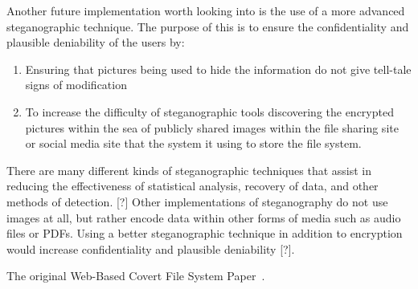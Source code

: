 \documentclass[12pt,journal,compsoc]{IEEEtran}
\begin{document}
Another future implementation worth looking into is the use of a more advanced steganographic technique. The purpose of this is to ensure the confidentiality and plausible deniability of the users by:
\begin{enumerate}
\item Ensuring that pictures being used to hide the information do not give tell-tale signs of modification
\item To increase the difficulty of steganographic tools discovering the encrypted pictures within the sea of publicly shared images within the file sharing site or social media site that the system it using to store the file system.
\end{enumerate}
There are many different kinds of steganographic techniques that assist in reducing the effectiveness of statistical analysis, recovery of data, and other methods of detection. [?] Other implementations of steganography do not use images at all, but rather encode data within other forms of media such as audio files or PDFs. Using a better steganographic technique in addition to encryption would increase confidentiality and plausible deniability [?]. %



The original Web-Based Covert File System Paper~\cite{Baliga2007}.


\end{document}
